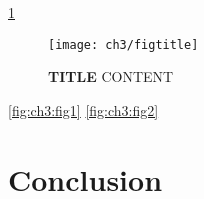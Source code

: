 \ref{fig:ch3:figtitle} 
\begin{figure}[t]
\texttt{[image: ch3/figtitle]}
\caption[SHORT]{\textbf{TITLE} CONTENT}
\label{fig:ch3:figtitle}
\end{figure}


\ref{fig:ch3:fig1} 
\ref{fig:ch3:fig2} 


\chapter{Conclusion}
\label{ch:conclusion}

